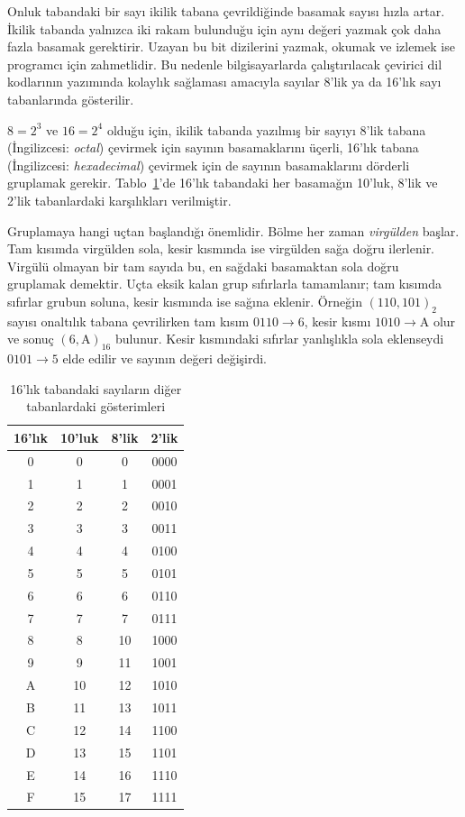 Onluk tabandaki bir sayı ikilik tabana çevrildiğinde basamak sayısı hızla artar. İkilik tabanda yalnızca iki rakam bulunduğu için aynı değeri yazmak çok daha fazla basamak gerektirir. Uzayan bu bit dizilerini yazmak, okumak ve izlemek ise programcı için zahmetlidir. Bu nedenle bilgisayarlarda çalıştırılacak çevirici dil kodlarının yazımında kolaylık sağlaması amacıyla sayılar 8'lik ya da 16'lık sayı tabanlarında gösterilir.

$8 = 2^3$ ve $16 = 2^4$ olduğu için, ikilik tabanda yazılmış bir sayıyı 8'lik tabana (İngilizcesi: \textit{octal}) çevirmek için sayının basamaklarını üçerli, 16'lık tabana (İngilizcesi: \textit{hexadecimal}) çevirmek için de sayının basamaklarını dörderli gruplamak gerekir. Tablo~\ref{tab:hex-tablo}'de 16'lık tabandaki her basamağın 10'luk, 8'lik ve 2'lik tabanlardaki karşılıkları verilmiştir.

Gruplamaya hangi uçtan başlandığı önemlidir. Bölme her zaman \emph{virgülden} başlar. Tam kısımda virgülden sola, kesir kısmında ise virgülden sağa doğru ilerlenir. Virgülü olmayan bir tam sayıda bu, en sağdaki basamaktan sola doğru gruplamak demektir. Uçta eksik kalan grup sıfırlarla tamamlanır; tam kısımda sıfırlar grubun soluna, kesir kısmında ise sağına eklenir. Örneğin $(110{,}101)_2$ sayısı onaltılık tabana çevrilirken tam kısım $0110 \to 6$, kesir kısmı $1010 \to \mathrm{A}$ olur ve sonuç $(6{,}\mathrm{A})_{16}$ bulunur. Kesir kısmındaki sıfırlar yanlışlıkla sola eklenseydi $0101 \to 5$ elde edilir ve sayının değeri değişirdi.

\begin{table}[H]
\centering
\caption{16'lık tabandaki sayıların diğer tabanlardaki gösterimleri}
\label{tab:hex-tablo}
\begin{tabular}{cccc}
\toprule
\textbf{16'lık} & \textbf{10'luk} & \textbf{8'lik} & \textbf{2'lik} \\
\midrule
0 & 0  & 0  & 0000 \\
1 & 1  & 1  & 0001 \\
2 & 2  & 2  & 0010 \\
3 & 3  & 3  & 0011 \\
4 & 4  & 4  & 0100 \\
5 & 5  & 5  & 0101 \\
6 & 6  & 6  & 0110 \\
7 & 7  & 7  & 0111 \\
8 & 8  & 10 & 1000 \\
9 & 9  & 11 & 1001 \\
A & 10 & 12 & 1010 \\
B & 11 & 13 & 1011 \\
C & 12 & 14 & 1100 \\
D & 13 & 15 & 1101 \\
E & 14 & 16 & 1110 \\
F & 15 & 17 & 1111 \\
\bottomrule
\end{tabular}
\end{table}


